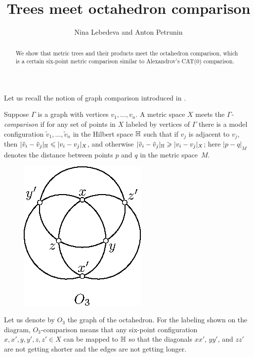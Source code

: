 \documentclass{article}
\def\thetitle{Trees meet octahedron comparison}
\def\theauthors{Nina Lebedeva and Anton Petrunin}
\begin{document}


\title{\thetitle}
\author{\theauthors}

\date{}
\maketitle
\begin{abstract}
We show that metric trees and their products meet the octahedron comparison, which is a certain six-point metric comparison similar to Alexandrov's CAT(0) comparison. 
\end{abstract}


Let us recall the notion of graph comparison introduced in \cite{lebedeva-petrunin-zolotov}.

Suppose $\Gamma$ is a graph with vertices $v_1,\dots,v_n$.
A metric space $X$ meets the \emph{$\Gamma$-comparison} if for any set of points in $X$ labeled by vertices of $\Gamma$ there is a model configuration $\tilde v_1,\dots,\tilde v_n$ in the Hilbert space $\mathbb H$ such that 
if $v_j$ is adjacent to $v_j$, then
$|\tilde v_i-\tilde v_j|_{\mathbb H}\leqslant | v_i-v_j|_{X}$,
and otherwise
$|\tilde v_i-\tilde v_j|_{\mathbb H}\geqslant | v_i-v_j|_{X}$;
here $|p-q|_M$ denotes the distance between points $p$ and $q$ in the metric space~$M$.

\begin{figure}
\vskip-3mm
\centering
\includegraphics{mppics/pic-30}
\end{figure}

Let us denote by $O_3$ the graph of the octahedron.
For the labeling shown on the diagram, $O_3$-comparison means that any six-point configuration $x,x',y,y',z,z'\in X$ can be mapped to $\mathbb H$ so that the diagonals $xx'$, $yy'$, and $zz'$ are not getting shorter
and the edges are not getting longer.
\end{document}
